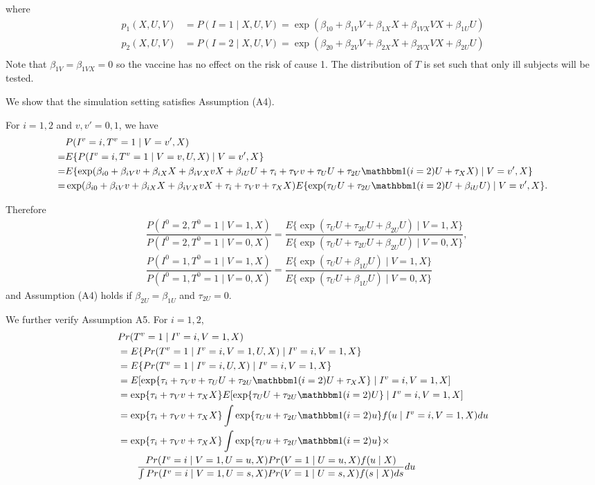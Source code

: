 \documentclass{article}
\begin{document}
where \begin{align*}
    p_1(X, U, V) &= P(I=1\mid X, U, V)=\exp(\beta_{10} + \beta_{1V}V + \beta_{1X}X + \beta_{1VX}VX + \beta_{1U}U)\\
    p_2(X, U, V) &= P(I=2\mid X, U, V)=\exp(\beta_{20} + \beta_{2V}V + \beta_{2X}X + \beta_{2VX}VX + \beta_{2U}U)\\
\end{align*}
Note that $\beta_{1V}=\beta_{1VX}=0$ so the vaccine has no effect on the risk of cause 1. The distribution of $T$ is set such that only ill subjects will be tested. 

We show that the simulation setting satisfies Assumption (A4).

For $i=1,2$ and $v,v'=0,1$, we have
\begin{align*}
    & P(I^v=i,T^v=1\mid V=v', X)\\
    =& E\{P(I^v=i,T^v=1\mid V=v, U, X)\mid V=v', X\}\\
    =& E\{\exp(\beta_{i0}+\beta_{iV}v+ \beta_{iX}X+\beta_{iVX}vX + \beta_{iU}U +\tau_i + \tau_V v + \tau_U U +  \tau_{2U}\mathbbm 1(i=2) U + \tau_X X)\mid V=v', X\}\\
    =& \exp(\beta_{i0} + \beta_{iV}v  +\beta_{iX}X +\beta_{iVX}vX + \tau_i + \tau_V v  + \tau_X X)E\{\exp(\tau_U U+  \tau_{2U}\mathbbm 1(i=2) U +\beta_{iU}U)\mid V=v', X\}.
\end{align*}

Therefore
\begin{align*}
&\dfrac{P(I^0=2, T^0=1\mid V=1,X)}{P(I^0=2, T^0=1 \mid V=0,X)}=\dfrac{E\{\exp(\tau_U U+ \tau_{2U} U 
 + \beta_{2U}U)\mid V=1, X\}}{E\{\exp(\tau_U U+\tau_{2U} U + \beta_{2U}U)\mid V=0, X\}},\\ 
 &\dfrac{P(I^0=1, T^0=1\mid V=1,X)}{P(I^0=1, T^0=1\mid V=0,X)}=\dfrac{E\{\exp(\tau_U U+\beta_{1U}U)\mid V=1, X\}}{E\{\exp(\tau_U U+\beta_{1U}U)\mid V=0, X\}}
\end{align*}
and Assumption (A4) holds if $\beta_{2U}=\beta_{1U}$ and $\tau_{2U}=0$.

We further verify Assumption A5. For $i=1, 2$,
\begin{align*}
    & Pr(T^v=1\mid I^v=i, V=1, X) \\&= E\{Pr(T^v=1\mid I^v=i, V=1, U, X)\mid I^v=i, V=1, X\}\\
    &= E\{Pr(T^v=1\mid I^v=i,  U, X)\mid I^v=i, V=1, X\}\\
    &= E[\exp\{\tau_{i}+\tau_V v  + \tau_U U + \tau_{2U}\mathbbm 1(i=2) U +  \tau_X X\}\mid I^v=i, V=1, X]\\
    &= \exp\{\tau_{i}+\tau_V v +  \tau_X X\}E[\exp\{\tau_U U + \tau_{2U}\mathbbm 1(i=2) U\}\mid I^v=i, V=1, X]\\
    &= \exp\{\tau_{i}+\tau_V v + \tau_X X\}\int \exp\{\tau_U u + \tau_{2U}\mathbbm 1(i=2) u \}f(u\mid I^v=i, V=1, X)du\\
    &= \exp\{\tau_{i}+\tau_V v +  \tau_X X\}\int \exp\{\tau_U u + \tau_{2U}\mathbbm 1(i=2) u \}\times\\
    &\qquad \dfrac{Pr(I^v=i\mid V=1, U=u, X)Pr(V=1\mid U=u, X)f(u\mid X)}{\int Pr(I^v=i\mid V=1, U=s, X)Pr(V=1\mid U=s, X)f(s\mid X) ds}du\\
\end{align*}
\end{document}
